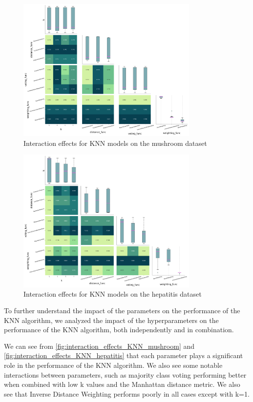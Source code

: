 \begin{figure}[!ht]
    \centering
    \includegraphics[width=0.8\textwidth]{figures/interaction_effects_KNN_mushroom.png}
    \caption{Interaction effects for KNN models on the mushroom dataset}
    \label{fig:interaction_effects_KNN_mushroom}
\end{figure}

\begin{figure}[!ht]
    \centering
    \includegraphics[width=0.8\textwidth]{figures/interaction_effects_KNN_hepatitis.png}
    \caption{Interaction effects for KNN models on the hepatitis dataset}
    \label{fig:interaction_effects_KNN_hepatitis}
\end{figure}

To further understand the impact of the parameters on the performance of the KNN algorithm,
we analyzed the impact of the hyperparameters on the performance of the KNN algorithm, both independently and in combination.

We can see from \autoref{fig:interaction_effects_KNN_mushroom} and \autoref{fig:interaction_effects_KNN_hepatitis} that each parameter plays a significant role in the performance of the KNN algorithm.
We also see some notable interactions between parameters, such as majority class voting performing better when combined with low k values and the Manhattan distance metric.
We also see that Inverse Distance Weighting performs poorly in all cases except with k=1.
